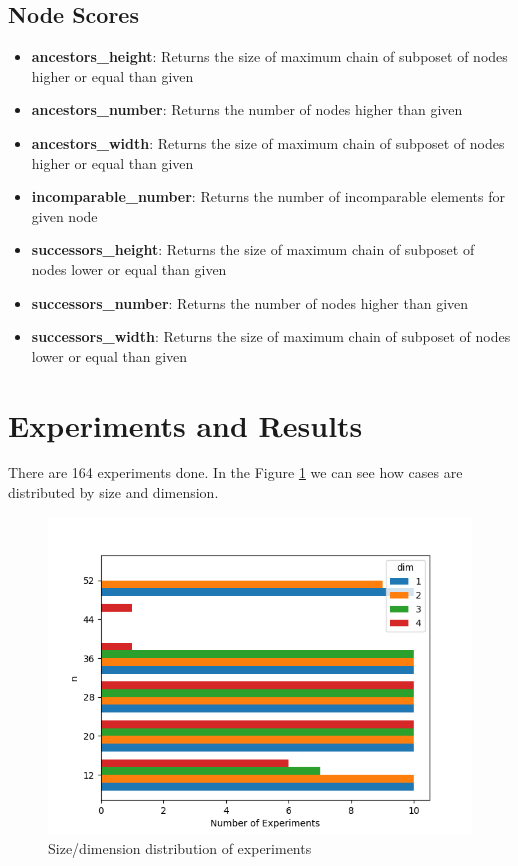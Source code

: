 \documentclass{article}
\begin{document}
\subsection{Node Scores}
\begin{itemize}
\item \textbf{ancestors\_height}: Returns the size of maximum chain of subposet of nodes higher or equal than given
\item \textbf{ancestors\_number}: Returns the number of nodes higher than given
\item \textbf{ancestors\_width}: Returns the size of maximum chain of subposet of nodes higher or equal than given
\item \textbf{incomparable\_number}: Returns the number of incomparable elements for given node
\item \textbf{successors\_height}: Returns the size of maximum chain of subposet of nodes lower or equal than given
\item \textbf{successors\_number}: Returns the number of nodes higher than given
\item \textbf{successors\_width}: Returns the size of maximum chain of subposet of nodes lower or equal than given
\end{itemize}

\section{Experiments and Results}
\par There are 164 experiments done. In the Figure \ref{fig:cases_distribution} we can see how cases are distributed by size and dimension.
\begin{figure}[ht]
  \centering
  \includegraphics[width=\textwidth]{pics/scores - cases.png}
  \caption{Size/dimension distribution of experiments}
  \label{fig:cases_distribution}
\end{figure}
\end{document}
